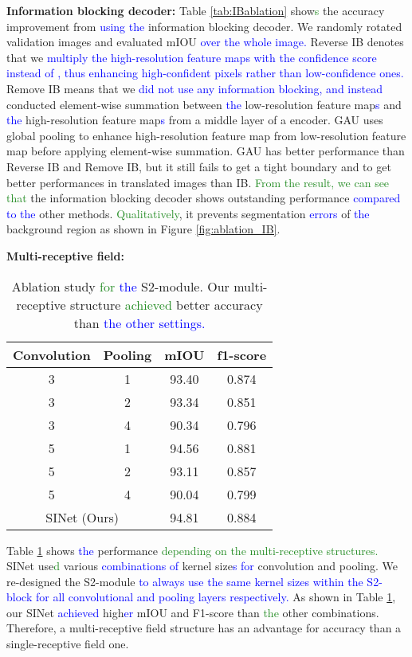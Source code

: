 \documentclass[10pt,twocolumn,letterpaper]{article}
\newcommand\Lars[1]{\textcolor{blue}{#1}}
\newcommand\yj[1]{\textcolor{ForestGreen}{#1}}
\newcommand\Lars[1]{#1}
\newcommand\yj[1]{#1}
\begin{document}
\noindent
\textbf{Information blocking decoder: } 
Table \ref{tab:IBablation} show\yj{s} the accuracy improvement from \Lars{using the} information blocking decoder.
We randomly rotated validation images and evaluated mIOU \Lars{over the whole image. }
Reverse IB denotes that we \Lars{multiply the high-resolution feature maps with the confidence score  instead of , thus enhancing high-confident pixels rather than low-confidence ones. }Remove IB means that we \Lars{did not use any information blocking, and instead} conducted element-wise summation between \Lars{the} low-resolution feature map\Lars{s} and \Lars{the} high-resolution feature map\Lars{s} from a middle layer of a encoder.
GAU uses global pooling to enhance high-resolution feature map from low-resolution feature map before applying element-wise summation.
GAU has better performance than Reverse IB and Remove IB, but it still fails to get a tight boundary and to get better performances in translated images than IB.
\yj{From the result, we can see that} the information blocking decoder shows outstanding performance \Lars{compared to the} other methods.
\yj{Qualitatively}, it prevents segmentation \Lars{errors} of \Lars{the} background region as shown in Figure \ref{fig:ablation_IB}.

\noindent
\textbf{Multi-receptive field: } 
\begin{table}[t]
  \begin{center}
    \begin{tabular}{ cc| cc}
    \hline
    Convolution & Pooling &  mIOU & f1-score \\
    \hline \hline
    
    3     & 1     & 93.40 & 0.874 \\
    3     & 2     & 93.34 & 0.851 \\
    3     & 4     & 90.34 & 0.796 \\
    5     & 1     & 94.56 & 0.881 \\
    5     & 2     & 93.11 & 0.857 \\
    5     & 4     & 90.04 & 0.799 \\
    \hline
    \multicolumn{2}{c|}{SINet (Ours)} & 94.81  & 0.884 \\

    \end{tabular}\end{center}
    
    \caption{Ablation study \yj{for} \Lars{the} S2-module. Our multi-receptive structure \yj{achieved} better accuracy than \Lars{the other settings. }}
     \label{tab:multiR}\end{table}Table \ref{tab:multiR} shows \Lars{the} performance \yj{depending on the multi-receptive structures.}
SINet use\yj{d} various \Lars{combinations of} kernel size\Lars{s for} convolution and pooling.
We re-designed the S2-module \Lars{to always use the same kernel sizes within the S2-block for all convolutional and pooling layers respectively. }As shown in Table \ref{tab:multiR}, our SINet \Lars{achieved} high\Lars{er} mIOU and F1-score than \yj{the} other combinations.
Therefore, a multi-receptive field structure has an advantage for accuracy than a single-receptive field one.
\end{document}
